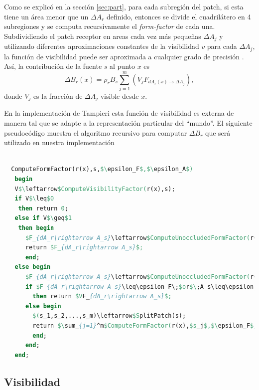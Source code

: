 \documentclass[letterpaper]{article}
\begin{document}
Como se explicó en la sección \ref{sec:part}, para cada subregión del
patch, si esta tiene un área menor que un $\Delta A_r$ definido,
entonces se divide el cuadrilátero en 4 subregiones y se computa
recursivamente el \textsl{form-factor} de cada una. Subdividiendo el
patch receptor en areas cada vez más pequeñas $\Delta A_j$ y
utilizando diferentes aproximaciones constantes de la visibilidad $v$
para cada $\Delta A_j$, la función de visibilidad puede ser aproximada
a cualquier grado de precisión \cite{ggems3}. Así, la contribución de
la fuente $s$ al punto $x$ es
$$\Delta B_r(x)=\rho_rB_s\sum_{j=1}^m(V_jF_{dA_r(x)\rightarrow\Delta A_j}),$$
donde $V_j$ es la fracción de $\Delta A_j$ visible desde $x$.

En la implementación de Tampieri \cite{ggems3} esta función de
visibilidad es externa de manera tal que se adapte a la representación
particular del ``mundo''. El siguiente pseudocódigo muestra el
algoritmo recursivo para computar $\Delta B_r$ que será utilizado en
nuestra implementación


\pagebreak{}
\begin{lstlisting}[language=Pascal,frame=single,caption=Cómputo de form-factors,mathescape=True]

  ComputeFormFactor(r(x),s,$\epsilon_F$,$\epsilon_A$)
   begin 
   V$\leftarrow$ComputeVisibilityFactor(r(x),s);
   if V$\leq$0
    then return 0;
   else if V$\geq$1
    then begin
      $F_{dA_r\rightarrow A_s}\leftarrow$ComputeUnoccludedFormFactor(r(x),s);
      return $F_{dA_r\rightarrow A_s}$;
      end;
   else begin
      $F_{dA_r\rightarrow A_s}\leftarrow$ComputeUnoccludedFormFactor(r(x),s);
      if $F_{dA_r\rightarrow A_s}\leq\epsilon_F\;$or$\;A_s\leq\epsilon_A$
        then return $VF_{dA_r\rightarrow A_s}$;
      else begin
        $(s_1,s_2,...,s_m)\leftarrow$SplitPatch(s);
        return $\sum_{j=1}^m$ComputeFormFactor(r(x),$s_j$,$\epsilon_F$,$\epsilon_A$);
        end;
      end;
   end;
\end{lstlisting}

\subsection{Visibilidad}
\label{sec:vis}
\end{document}
